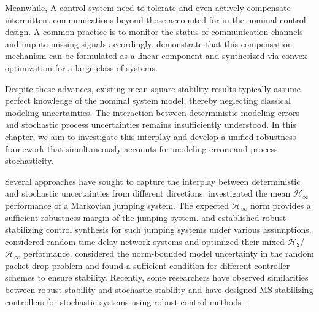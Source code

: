 Meanwhile, A control system need to tolerate and even actively compensate intermittent communications beyond those accounted for in the nominal control design. A common practice is to monitor the status of communication channels and impute missing signals accordingly. \cite{Matt2014cvxMScontrol, Matt2014cvxMScontrol_act, Matt2017thesis} demonstrate that this compensation mechanism can be formulated as a linear component and synthesized via convex optimization for a large class of systems. 

Despite these advances, existing mean square stability results typically assume perfect knowledge of the nominal system model, thereby neglecting classical modeling uncertainties. The interaction between deterministic modeling errors and stochastic process uncertainties remains insufficiently understood. In this chapter, we aim to investigate this interplay and develop a unified robustness framework that simultaneously accounts for modeling errors and process stochasticity.

Several approaches have sought to capture the interplay between deterministic and stochastic uncertainties from different directions. \cite{Seiler2003BRLjs} investigated the mean $\mathcal{H}_\infty$ performance of a Markovian jumping system. The expected \(\mathcal{H}_\infty\) norm provides a sufficient robustness margin of the jumping system. \cite{Seiler2005HinfNC, Stab_MJLS_1} and \cite{Stab_MJLS_2} established robust stabilizing control synthesis for such jumping systems under various assumptions. \cite{MixH_2infcontrolforrandomsys} considered random time delay network systems and optimized their mixed $\mathcal{H}_2$/$\mathcal{H}_\infty$ performance. \cite{CtrlPackDrop_uncertain} considered the norm-bounded model uncertainty in the random packet drop problem and found a sufficient condition for different controller schemes to ensure stability.
Recently, some researchers have observed similarities between robust stability and stochastic stability and have designed MS stabilizing controllers for stochastic systems using robust control methods~\cite{RobustControl_Mulnoise}.  





